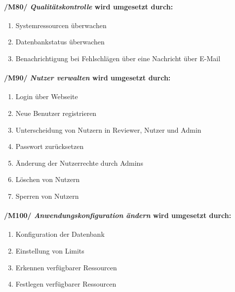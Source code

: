\paragraph{/M80/ \textit{Qualitätskontrolle} wird umgesetzt durch:}

\begin{enumerate}
    \setlength\itemsep{-1em}
    \setcounter{enumi}{\value{FAs}}
    \item Systemressourcen überwachen
    \item Datenbankstatus überwachen
    \item Benachrichtigung bei Fehlschlägen über eine Nachricht über E-Mail
    \setcounter{FAs}{\value{enumi}}
\end{enumerate}
    
\paragraph{/M90/ \textit{Nutzer verwalten} wird umgesetzt durch:}

\begin{enumerate}
    \setlength\itemsep{-1em}
    \setcounter{enumi}{\value{FAs}}
    \item Login über Webseite
    \item Neue Benutzer registrieren
    \item Unterscheidung von Nutzern in \gls{Reviewer}, \gls{Nutzer} und \gls{Admin}
    \item Passwort zurücksetzen
    \item Änderung der Nutzerrechte durch \glspl{Admin}
    \item Löschen von Nutzern
    \item Sperren von Nutzern %
    \setcounter{FAs}{\value{enumi}}
\end{enumerate}
    
\paragraph{/M100/ \textit{Anwendungskonfiguration ändern} wird umgesetzt durch:}

\begin{enumerate}
    \setlength\itemsep{-1em}
    \setcounter{enumi}{\value{FAs}}
    \item Konfiguration der Datenbank
    \item Einstellung von \gls{Limits} %
    \item Erkennen verfügbarer \gls{Ressourcen}
    \item Festlegen verfügbarer Ressourcen
\end{enumerate}